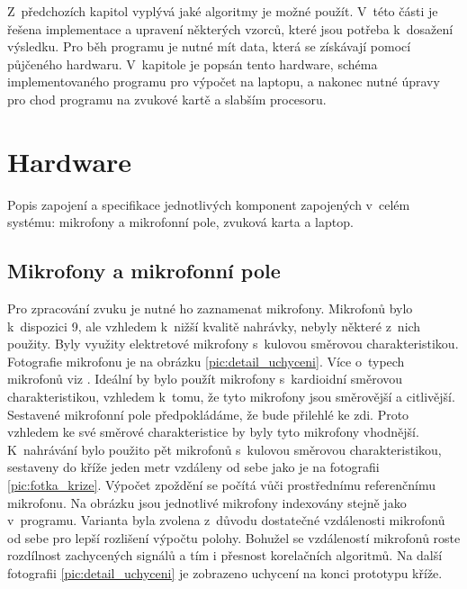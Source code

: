 Z~předchozích kapitol vyplývá jaké algoritmy je možné použít. V~této části je řešena implementace a upravení některých vzorců, které jsou potřeba k~dosažení výsledku. Pro běh programu je nutné mít data, která se získávají pomocí půjčeného hardwaru. V~kapitole je popsán tento hardware, schéma implementovaného programu pro výpočet na laptopu, a nakonec nutné úpravy pro chod programu na zvukové kartě a slabším procesoru.

\section{Hardware}

Popis zapojení a specifikace jednotlivých komponent zapojených v~celém systému: mikrofony a mikrofonní pole, zvuková karta a laptop.

\subsection{Mikrofony a mikrofonní pole}

Pro zpracování zvuku je nutné ho zaznamenat mikrofony. Mikrofonů bylo k~dispozici 9, ale vzhledem k~nižší kvalitě nahrávky, nebyly některé z~nich použity. Byly využity elektretové mikrofony s~kulovou směrovou charakteristikou. Fotografie mikrofonu je na obrázku \ref{pic:detail_uchyceni}. Více o~typech mikrofonů viz \cite{mikrofony}. Ideální by bylo použít mikrofony s~kardioidní směrovou charakteristikou, vzhledem k~tomu, že tyto mikrofony jsou směrovější a citlivější. Sestavené mikrofonní pole předpokládáme, že bude přilehlé ke zdi. Proto vzhledem ke své směrové charakteristice by byly tyto mikrofony vhodnější. K~nahrávání bylo použito pět mikrofonů s~kulovou směrovou charakteristikou, sestaveny do kříže jeden metr vzdáleny od sebe jako je na fotografii \ref{pic:fotka_krize}. Výpočet zpoždění se počítá vůči prostřednímu referenčnímu mikrofonu. Na obrázku jsou jednotlivé mikrofony indexovány stejně jako v~programu. Varianta byla zvolena z~důvodu dostatečné vzdálenosti mikrofonů od sebe pro lepší rozlišení výpočtu polohy. Bohužel se vzdáleností mikrofonů roste rozdílnost zachycených signálů a tím i přesnost korelačních algoritmů. Na další fotografii \ref{pic:detail_uchyceni} je zobrazeno uchycení na konci prototypu kříže.

